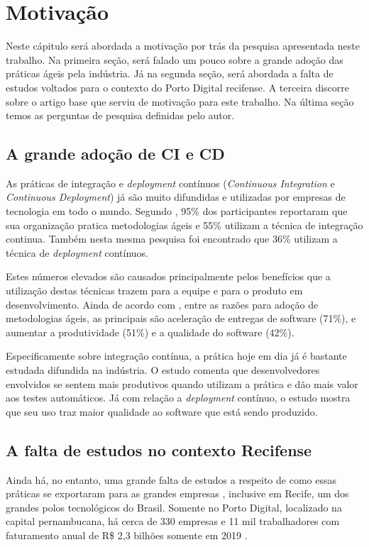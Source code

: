 
\chapter{Motivação}
Neste cápitulo será abordada a motivação por trás da pesquisa apresentada neste trabalho. Na primeira seção, será falado um pouco sobre a grande adoção das práticas ágeis pela indústria. Já na segunda seção, será abordada a falta de estudos voltados para o contexto do Porto Digital recifense. A terceira discorre sobre o artigo base que serviu de motivação para este trabalho. Na última seção temos as perguntas de pesquisa definidas pelo autor.

\section{A grande adoção de CI e CD}
As práticas de integração e \emph{deployment} contínuos (\emph{Continuous Integration} e \emph{Continuous Deployment}) já são muito difundidas e utilizadas por empresas de tecnologia em todo o mundo. Segundo \cite{stateAgileReport2020}, 95\% dos participantes reportaram que sua organização pratica metodologias ágeis e 55\% utilizam a técnica de integração continua. Também nesta mesma pesquisa foi encontrado que 36\% utilizam a técnica de \emph{deployment} contínuos. 

Estes números elevados são causados principalmente pelos benefícios que a utilização destas técnicas trazem para a equipe e para o produto em desenvolvimento. Ainda de acordo com \cite{stateAgileReport2020}, entre as razões para adoção de metodologias ágeis, as principais são aceleração de entregas de software (71\%), e aumentar a produtividade (51\%) e a qualidade do software (42\%). 

Especificamente sobre integração contínua, a prática hoje em dia já é bastante estudada difundida na indústria. O estudo \cite{hilton2016} comenta que desenvolvedores envolvidos se sentem mais produtivos quando utilizam a prática e dão mais valor aos testes automáticos.  Já com relação a \emph{deployment} contínuo, o estudo \cite{savor2015} mostra que seu uso traz maior qualidade ao software que está sendo produzido. 

\section{A falta de estudos no contexto Recifense}

Ainda há, no entanto, uma grande falta de estudos a respeito de como essas práticas se exportaram para as grandes empresas \cite{empiricalStudy2016}, inclusive em Recife, um dos grandes polos tecnológicos do Brasil. Somente no Porto Digital, localizado na capital pernambucana, há cerca de 330 empresas e 11 mil trabalhadores com faturamento anual de R\$ 2,3 bilhões somente em 2019 \cite{portoDigital}.

